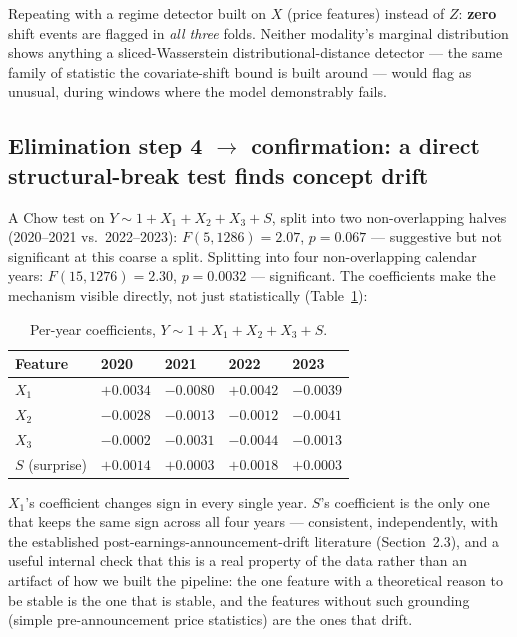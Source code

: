 \documentclass[11pt]{article}
\begin{document}
Repeating with a regime detector built on $X$ (price features) instead of $Z$: \textbf{zero} shift events are flagged in \emph{all three} folds. Neither modality's marginal distribution shows anything a sliced-Wasserstein distributional-distance detector --- the same family of statistic the covariate-shift bound is built around --- would flag as unusual, during windows where the model demonstrably fails.

\subsection{Elimination step 4 $\to$ confirmation: a direct structural-break test finds concept drift}
\label{sec:structural-break}

A Chow test on $Y \sim 1 + X_1 + X_2 + X_3 + S$, split into two non-overlapping halves (2020--2021 vs.\ 2022--2023): $F(5,1286)=2.07$, $p=0.067$ --- suggestive but not significant at this coarse a split. Splitting into four non-overlapping calendar years: $F(15,1276)=2.30$, $p=0.0032$ --- significant. The coefficients make the mechanism visible directly, not just statistically (Table~\ref{tab:chow-coefs}):

\begin{table}[H]
\centering
\caption{Per-year coefficients, $Y \sim 1 + X_1 + X_2 + X_3 + S$.}
\label{tab:chow-coefs}
\begin{tabular}{@{}lllll@{}}
\toprule
Feature & 2020 & 2021 & 2022 & 2023 \\
\midrule
$X_1$ & $+0.0034$ & $-0.0080$ & $+0.0042$ & $-0.0039$ \\
$X_2$ & $-0.0028$ & $-0.0013$ & $-0.0012$ & $-0.0041$ \\
$X_3$ & $-0.0002$ & $-0.0031$ & $-0.0044$ & $-0.0013$ \\
$S$ (surprise) & $+0.0014$ & $+0.0003$ & $+0.0018$ & $+0.0003$ \\
\bottomrule
\end{tabular}
\end{table}

$X_1$'s coefficient changes sign in every single year. $S$'s coefficient is the only one that keeps the same sign across all four years --- consistent, independently, with the established post-earnings-announcement-drift literature (Section~2.3), and a useful internal check that this is a real property of the data rather than an artifact of how we built the pipeline: the one feature with a theoretical reason to be stable is the one that is stable, and the features without such grounding (simple pre-announcement price statistics) are the ones that drift.
\end{document}
